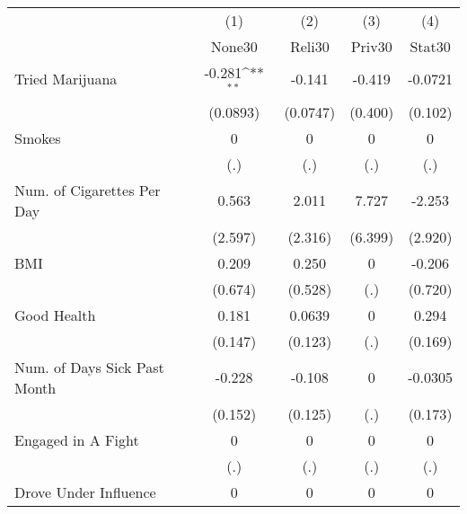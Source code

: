 {
\def\sym#1{\ifmmode^{#1}\else\(^{#1}\)\fi}
\begin{tabular}{l*{4}{c}}
\hline\hline
            &\multicolumn{1}{c}{(1)}&\multicolumn{1}{c}{(2)}&\multicolumn{1}{c}{(3)}&\multicolumn{1}{c}{(4)}\\
            &\multicolumn{1}{c}{None30}&\multicolumn{1}{c}{Reli30}&\multicolumn{1}{c}{Priv30}&\multicolumn{1}{c}{Stat30}\\
\hline
Tried Marijuana&      -0.281\sym{**} &      -0.141         &      -0.419         &     -0.0721         \\
            &    (0.0893)         &    (0.0747)         &     (0.400)         &     (0.102)         \\
[1em]
Smokes      &           0         &           0         &           0         &           0         \\
            &         (.)         &         (.)         &         (.)         &         (.)         \\
[1em]
Num. of Cigarettes Per Day&       0.563         &       2.011         &       7.727         &      -2.253         \\
            &     (2.597)         &     (2.316)         &     (6.399)         &     (2.920)         \\
[1em]
BMI         &       0.209         &       0.250         &           0         &      -0.206         \\
            &     (0.674)         &     (0.528)         &         (.)         &     (0.720)         \\
[1em]
Good Health &       0.181         &      0.0639         &           0         &       0.294         \\
            &     (0.147)         &     (0.123)         &         (.)         &     (0.169)         \\
[1em]
Num. of Days Sick Past Month&      -0.228         &      -0.108         &           0         &     -0.0305         \\
            &     (0.152)         &     (0.125)         &         (.)         &     (0.173)         \\
[1em]
Engaged in A Fight&           0         &           0         &           0         &           0         \\
            &         (.)         &         (.)         &         (.)         &         (.)         \\
[1em]
Drove Under Influence&           0         &           0         &           0         &           0         \\

\end{tabular}}
